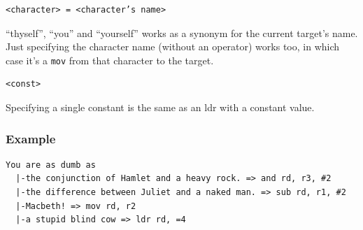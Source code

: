 \documentclass[11pt]{article}
\begin{document}
\begin{verbatim}
<character> = <character’s name>
\end{verbatim}
“thyself”, “you” and “yourself” works as a synonym for the current target’s name.
Just specifying the character name (without an operator) works too, in which case it’s a \verb|mov| from that character to the target.
\begin{verbatim}
<const>
\end{verbatim}
Specifying a single constant is the same as an ldr with a constant value.

\subsubsection{Example}
\begin{verbatim}
You are as dumb as
  |-the conjunction of Hamlet and a heavy rock. => and rd, r3, #2
  |-the difference between Juliet and a naked man. => sub rd, r1, #2
  |-Macbeth! => mov rd, r2
  |-a stupid blind cow => ldr rd, =4
\end{verbatim}
\end{document}
